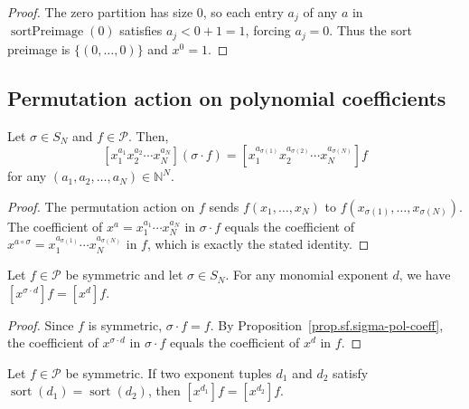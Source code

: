 \begin{proof}
\leanok
The zero partition has size $0$, so each entry $a_j$ of any $a$ in
$\operatorname{sortPreimage}(0)$ satisfies $a_j < 0 + 1 = 1$, forcing $a_j = 0$.
Thus the sort preimage is $\{(0, \ldots, 0)\}$ and $x^0 = 1$.
\end{proof}

\subsection{Permutation action on polynomial coefficients}

\begin{proposition}
\label{prop.sf.sigma-pol-coeff}
\leantarget
\leanok
Let $\sigma\in S_{N}$ and $f\in\mathcal{P}$.
Then,%
\[
\left[  x_{1}^{a_{1}}x_{2}^{a_{2}}\cdots x_{N}^{a_{N}}\right]  \left(
\sigma\cdot f\right)  =\left[  x_{1}^{a_{\sigma\left(  1\right)  }}%
x_{2}^{a_{\sigma\left(  2\right)  }}\cdots x_{N}^{a_{\sigma\left(  N\right)
}}\right]  f
\]
for any $\left(  a_{1},a_{2},\ldots,a_{N}\right)  \in\mathbb{N}^{N}$.
\end{proposition}

\begin{proof}
The permutation action on $f$ sends $f(x_1, \ldots, x_N)$ to $f(x_{\sigma(1)}, \ldots, x_{\sigma(N)})$.
The coefficient of $x^a = x_1^{a_1} \cdots x_N^{a_N}$ in $\sigma \cdot f$
equals the coefficient of $x^{a \circ \sigma} = x_1^{a_{\sigma(1)}} \cdots x_N^{a_{\sigma(N)}}$ in $f$,
which is exactly the stated identity.
\end{proof}

\begin{lemma}
\label{lem.sf.coeff-perm-symmetric}
\leanhelper
\leanok
Let $f \in \mathcal{P}$ be symmetric and let $\sigma \in S_N$.
For any monomial exponent $d$, we have
$[x^{\sigma \cdot d}] f = [x^d] f$.
\end{lemma}

\begin{proof}
\leanok
Since $f$ is symmetric, $\sigma \cdot f = f$.
By Proposition~\ref{prop.sf.sigma-pol-coeff}, the coefficient of $x^{\sigma \cdot d}$
in $\sigma \cdot f$ equals the coefficient of $x^d$ in $f$.
\end{proof}

\begin{lemma}
\label{lem.sf.coeff-same-sort}
\leanhelper
\leanok
Let $f \in \mathcal{P}$ be symmetric. If two exponent tuples $d_1$ and $d_2$
satisfy $\operatorname{sort}(d_1) = \operatorname{sort}(d_2)$, then
$[x^{d_1}] f = [x^{d_2}] f$.
\end{lemma}

